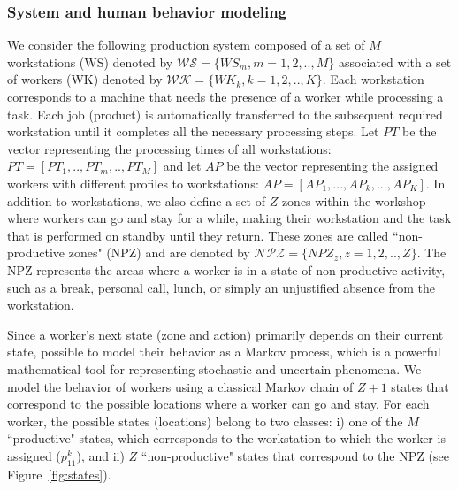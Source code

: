 \documentclass[review,12pt, 3p, times]{elsarticle}
\begin{document}
\subsubsection{System and human behavior modeling}
We consider the following production system composed of a set of $M$ workstations (WS) denoted by $\mathcal{W\!S}=\{W\!S_m, m=1,2,..,M\}$ associated with a set of workers (WK) denoted by $\mathcal{W\!K}=\{W\!K_k, k=1,2,..,K\}$.
Each workstation corresponds to a machine that needs the presence of a worker while processing a task. Each job (product) is automatically transferred to the subsequent required workstation until it completes all the necessary processing steps. Let $PT$ be the vector representing the processing times of all workstations:  
$PT=[PT_1,.., PT_m,.., PT_M]$  and let $AP$ be the vector representing the assigned workers with different  profiles to workstations: $AP=[AP_1, ..., AP_k, ..., AP_K]$. 
In addition to workstations, we also define a set of $Z$ zones within the workshop where workers can go and stay for a while, making their workstation and the task that is performed on standby until they return. These zones are called “non-productive zones" (NPZ) and are denoted by $\mathcal{NPZ}=\{N\!P\!Z_z, z=1,2,..,Z\}$. The NPZ represents the areas where a worker is in a state of non-productive activity, such as a break, personal call, lunch, or simply an unjustified absence from the workstation.

Since a worker's next state (zone and action) primarily depends on their current state,  possible to model their behavior as a Markov process, which is a powerful mathematical tool for representing stochastic and uncertain phenomena. We model the behavior of workers using a classical Markov chain of $Z+1$ states that correspond to the possible locations where a worker can go and stay. For each worker, the possible states (locations) belong to two classes: i) one of the $M$ ``productive" states, which corresponds to the workstation to which the worker is assigned ($p_{11}^k$), and ii) $Z$ ``non-productive" states that correspond to the NPZ (see Figure~\ref{fig:states}).
\end{document}
